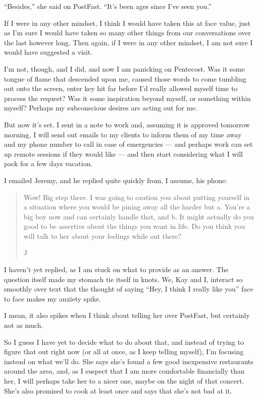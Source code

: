 ``Besides,'' she said on PostFast. ``It's been ages since I've seen you.''

If I were in any other mindset, I think I would have taken this at face value, just as I'm sure I would have taken so many other things from our conversations over the last however long. Then again, if I were in any other mindset, I am not sure I would have suggested a visit.

I'm not, though, and I did, and now I am panicking on Pentecost. Was it some tongue of flame that descended upon me, caused those words to come tumbling out onto the screen, enter key hit far before I'd really allowed myself time to process the request? Was it some inspiration beyond myself, or something within myself? Perhaps my subconscious desires are acting out for me.

But now it's set. I sent in a note to work and, assuming it is approved tomorrow morning, I will send out emails to my clients to inform them of my time away and my phone number to call in case of emergencies --- and perhaps work can set up remote sessions if they would like --- and then start considering what I will pack for a few days vacation.

I emailed Jeremy, and he replied quite quickly from, I assume, his phone:

\begin{quote}
\color{DarkSlateGray}
Wow! Big step there. I was going to caution you about putting yourself in a situation where you would be pining away all the harder but a. You're a big boy now and can certainly handle that, and b. It might actually do you good to be assertive about the things you want in life. Do you think you will talk to her about your feelings while out there?

J
\end{quote}

I haven't yet replied, as I am stuck on what to provide as an answer. The question itself made my stomach tie itself in knots. We, Kay and I, interact so smoothly over text that the thought of saying ``Hey, I think I really like you'' face to face makes my anxiety spike.

I mean, it also spikes when I think about telling her over PostFast, but certainly not as much.

So I guess I have yet to decide what to do about that, and instead of trying to figure that out right now (or all at once, as I keep telling myself), I'm focusing instead on what we'll do. She says she's found a few good inexpensive restaurants around the area, and, as I suspect that I am more comfortable financially than her, I will perhaps take her to a nicer one, maybe on the night of that concert. She's also promised to cook at least once and says that she's not bad at it.

